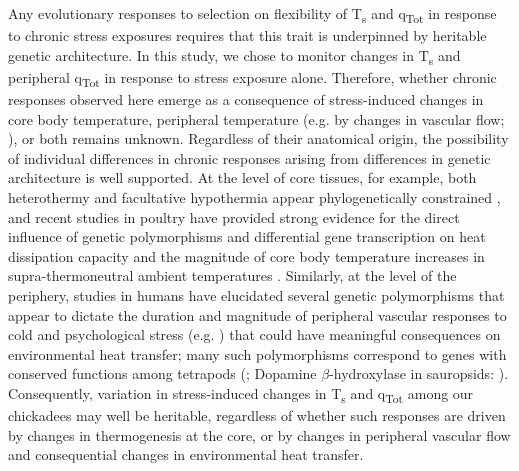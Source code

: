 \documentclass[12pt]{article}
\begin{document}
\noindent Any evolutionary responses to selection on flexibility of T\textsubscript{s} and q\textsubscript{Tot} in response to chronic stress exposures requires that this trait is underpinned by heritable genetic architecture. In this study, we chose to monitor changes in T\textsubscript{s} and peripheral q\textsubscript{Tot} in response to stress exposure alone. Therefore, whether chronic responses observed here emerge as a consequence of stress-induced changes in core body temperature, peripheral temperature (e.g. by changes in vascular flow; \citealt{oka_2001}), or both remains unknown. Regardless of their anatomical origin, the possibility of individual differences in chronic responses arising from differences in genetic architecture is well supported. At the level of core tissues, for example, both heterothermy and facultative hypothermia appear phylogenetically constrained \citep{boyles_2013,gerson_2019}, and recent studies in poultry have provided strong evidence for the direct influence of genetic polymorphisms and differential gene transcription on heat dissipation capacity and the magnitude of core body temperature increases in supra-thermoneutral ambient temperatures \citep{srikanth_2019,zhuang_2019}. Similarly, at the level of the periphery, studies in humans have elucidated several genetic polymorphisms that appear to dictate the duration and magnitude of peripheral vascular responses to cold and psychological stress (e.g. \citealt{rao_2008,chen_2010,kelsey_2010,kelsey_2012,huang_2012}) that could have meaningful consequences on environmental heat transfer; many such polymorphisms correspond to genes with conserved functions among tetrapods (\citealt{vincent_1998,yamamoto_2011,cespedes_2017}; Dopamine $\beta$-hydroxylase in sauropsids: \citealt{lovell_2015}). Consequently, variation in stress-induced changes in T\textsubscript{s} and q\textsubscript{Tot} among our chickadees may well be heritable, regardless of whether such responses are driven by changes in thermogenesis at the core, or by changes in peripheral vascular flow and consequential changes in environmental heat transfer. \vspace{1cm}
\end{document}
